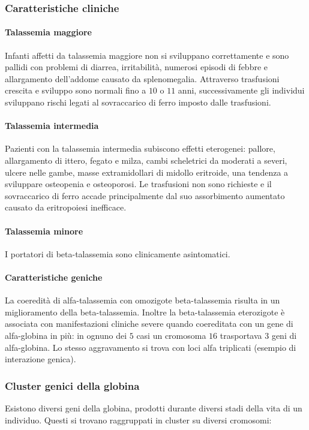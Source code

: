 \subsubsection{Caratteristiche cliniche}
\paragraph{Talassemia maggiore}
Infanti affetti da talassemia maggiore non si sviluppano correttamente e sono pallidi con problemi di diarrea, irritabilit\`a, numerosi episodi di febbre e allargamento dell'addome
causato da splenomegalia. Attraverso trasfusioni crescita e sviluppo sono normali fino a $10$ o $11$ anni, successivamente gli individui sviluppano rischi legati al sovraccarico di 
ferro imposto dalle trasfusioni.
\paragraph{Talassemia intermedia}
Pazienti con la talassemia intermedia subiscono effetti eterogenei: pallore, allargamento di ittero, fegato e milza, cambi scheletrici da moderati a 
severi, ulcere nelle gambe, masse extramidollari di midollo eritroide, una tendenza a sviluppare osteopenia e osteoporosi. Le trasfusioni non sono richieste e il sovraccarico di ferro
accade principalmente dal suo assorbimento aumentato causato da eritropoiesi inefficace. 
\paragraph{Talassemia minore} 
I portatori di beta-talassemia sono clinicamente asintomatici. 
\paragraph{Caratteristiche geniche}
La coeredit\`a di alfa-talassemia con omozigote beta-talassemia risulta in un miglioramento della beta-talassemia. Inoltre la beta-talassemia eterozigote \`e associata con manifestazioni
cliniche severe quando coereditata con un gene di alfa-globina in pi\`u: in ognuno dei $5$ casi un cromosoma $16$ trasportava $3$ geni di alfa-globina. Lo stesso aggravamento si trova
con loci alfa triplicati (esempio di interazione genica). 
\subsubsection{Cluster genici della globina}
Esistono diversi geni della globina, prodotti durante diversi stadi della vita di un individuo. Questi si trovano raggruppati in cluster su diversi cromosomi: 
